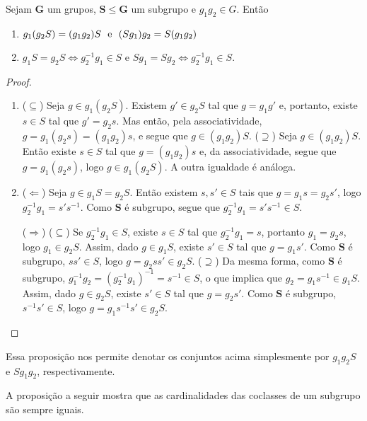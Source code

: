 \begin{prop}
\label{alge:prop.gru.coclas}
Sejam $\bm G$ um grupos, $\bm S \leq \bm G$ um subgrupo e $g_1g_2 \in G$. Então
	\begin{enumerate}
	\item $g_1(g_2S) = (g_1g_2)S \text{\ \ e\ \ } (Sg_1)g_2 = S(g_1g_2)$
	\item $g_1S=g_2S \Leftrightarrow g_2^{-1}g_1 \in S$ e $Sg_1=Sg_2 \Leftrightarrow g_2^{-1}g_1 \in S$.
	\end{enumerate}
\end{prop}
\begin{proof}
	\begin{enumerate}
	\item ($\subseteq$) Seja $g \in g_1(g_2S)$. Existem $g' \in g_2S$ tal que $g=g_1g'$ e, portanto, existe $s \in S$ tal que $g'=g_2s$. Mas então, pela associatividade, $g=g_1(g_2s) = (g_1g_2)s$, e segue que $g \in (g_1g_2)S$.
($\supseteq$) Seja $g \in (g_1g_2)S$. Então existe $s \in S$ tal que $g=(g_1g_2)s$ e, da associatividade, segue que $g=g_1(g_2s)$, logo $g \in g_1(g_2S)$. A outra igualdade é análoga.
	
	\item ($\Leftarrow$) Seja $g \in g_1S=g_2S$. Então existem $s,s' \in S$ tais que $g=g_1s=g_2s'$, logo $g_2^{-1}g_1=s's^{-1}$. Como $\bm S$ é subgrupo, segue que $g_2^{-1}g_1=s's^{-1} \in S$.

\noindent
($\Rightarrow$) ($\subseteq$) Se $g_2^{-1}g_1 \in S$, existe $s \in S$ tal que $g_2^{-1}g_1=s$, portanto $g_1=g_2s$, logo $g_1 \in g_2S$. Assim, dado $g \in g_1S$, existe $s' \in S$ tal que $g=g_1s'$. Como $\bm S$ é subgrupo, $ss' \in S$, logo $g=g_2ss' \in g_2S$. ($\supseteq$) Da mesma forma, como $\bm S$ é subgrupo, $g_1^{-1}g_2=(g_2^{-1}g_1)^{-1}=s^{-1} \in S$, o que implica que $g_2=g_1s^{-1} \in g_1S$. Assim, dado $g \in g_2S$, existe $s' \in S$ tal que $g=g_2s'$. Como $\bm S$ é subgrupo, $s^{-1}s' \in S$, logo $g=g_1s^{-1}s' \in g_2S$.
	\end{enumerate}

\end{proof}

Essa proposição nos permite denotar os conjuntos acima simplesmente por $g_1g_2S$ e $Sg_1g_2$, respectivamente.

A proposição a seguir mostra que as cardinalidades das coclasses de um subgrupo são sempre iguais.

